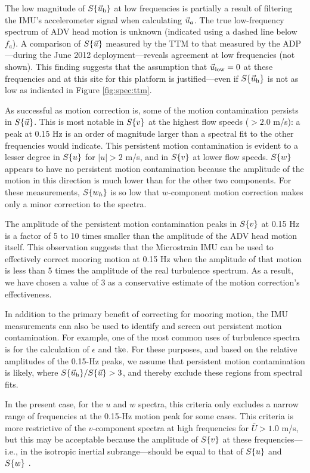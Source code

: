 The low magnitude of $S\{\vec{u}_\mathrm{h}\}$ at low frequencies is partially a result of filtering the IMU's accelerometer signal when calculating $\vec{u}_a$. The true low-frequency spectrum of ADV head motion is unknown (indicated using a dashed line below $f_a$). A comparison of $S\{\vec{u}\}$ measured by the TTM to that measured by the ADP---during the June 2012 deployment---reveals agreement at low frequencies (not shown). This finding suggests that the assumption that $\vec{u}_\mathrm{low}=0$ at these frequencies and at this site for this platform is justified---even if $S\{\vec{u}_\mathrm{h}\}$ is not as low as indicated in Figure \ref{fig:spec:ttm}.

As successful as motion correction is, some of the motion contamination persists in $S\{\vec{u}\}$. This is most notable in $S\{v\}$ at the highest flow speeds ($>2.0$ m/s): a peak at 0.15 Hz is an order of magnitude larger than a spectral fit to the other frequencies would indicate. This persistent motion contamination is evident to a lesser degree in $S\{u\}$ for $|u|>2$ m/s, and in $S\{v\}$ at lower flow speeds.  $S\{w\}$ appears to have no persistent motion contamination because the amplitude of the motion in this direction is much lower than for the other two components. For these measurements, $S\{w_h\}$ is so low that $w$-component motion correction makes only a minor correction to the spectra.

The amplitude of the persistent motion contamination peaks in $S\{v\}$ at 0.15 Hz is a factor of 5 to 10 times smaller than the amplitude of the ADV head motion itself. This observation suggests that the Microstrain IMU can be used to effectively correct mooring motion at 0.15 Hz when the amplitude of that motion is less than 5 times the amplitude of the real turbulence spectrum. As a result, we have chosen a value of 3 as a conservative estimate of the motion correction's effectiveness.

In addition to the primary benefit of correcting for mooring motion, the IMU measurements can also be used to identify and screen out persistent motion contamination. For example, one of the most common uses of turbulence spectra is for the calculation of $\epsilon$ and $\mathrm{tke}$. For these purposes, and based on the relative amplitudes of the 0.15-Hz peaks, we assume that persistent motion contamination is likely, where $S\{\vec{u}_\mathrm{h}\}/S\{\vec{u}\} > 3$, and thereby exclude these regions from spectral fits.

In the present case, for the $u$ and $w$ spectra, this criteria only excludes a narrow range of frequencies at the 0.15-Hz motion peak for some cases. This criteria is more restrictive of the $v$-component spectra at high frequencies for $\bar U > 1.0$ m/s, but this may be acceptable because the amplitude of $S\{v\}$ at these frequencies---i.e., in the isotropic inertial subrange---should be equal to that of $S\{u\}$ and $S\{w\}$ \cite[]{Kolmogorov1941c}.

